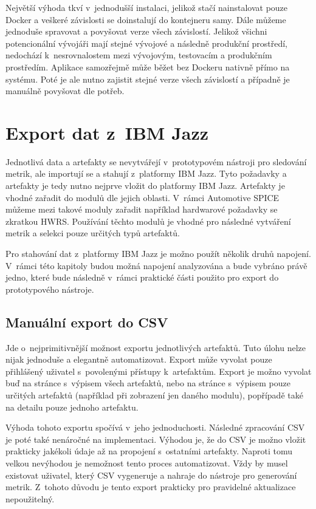 \documentclass[czech,master]{diploma}
\begin{document}
Největší výhoda tkví v~jednodušší instalaci, jelikož stačí nainstalovat pouze Docker a veškeré závislosti se doinstalují do kontejneru samy. Dále můžeme jednoduše spravovat a povyšovat verze všech závislostí. Jelikož všichni potencionální vývojáři mají stejné vývojové a následně produkční prostředí, nedochází k~nesrovnalostem mezi vývojovým, testovacím a produkčním prostředím. Aplikace samozřejmě může běžet bez Dockeru nativně přímo na systému. Poté je ale nutno zajistit stejné verze všech závislostí a případně je manuálně povyšovat dle potřeb.



\section{Export dat z~IBM Jazz}
\label{sec:ibm_export}

Jednotlivá data a artefakty se nevytvářejí v~prototypovém nástroji pro sledování metrik, ale importují se a stahují z~platformy IBM Jazz. Tyto požadavky a artefakty je tedy nutno nejprve vložit do platformy IBM Jazz. Artefakty je vhodné zařadit do modulů dle jejich oblasti. V~rámci Automotive SPICE můžeme mezi takové moduly zařadit například hardwarové požadavky se zkratkou HWRS. Používání těchto modulů je vhodné pro následné vytváření metrik a selekci pouze určitých typů artefaktů.

Pro stahování dat z~platformy IBM Jazz je možno použít několik druhů napojení. V~rámci této kapitoly budou možná napojení analyzována a bude vybráno právě jedno, které bude následně v~rámci praktické části použito pro export do prototypového nástroje.

\subsection{Manuální export do CSV}
Jde o~nejprimitivnější možnost exportu jednotlivých artefaktů. Tuto úlohu nelze nijak jednoduše a elegantně automatizovat. Export může vyvolat pouze přihlášený uživatel s~povolenými přístupy k~artefaktům. Export je možno vyvolat buď na stránce s~výpisem všech artefaktů, nebo na stránce s~výpisem pouze určitých artefaktů (například při zobrazení jen daného modulu), popřípadě také na detailu pouze jednoho artefaktu.

Výhoda tohoto exportu spočívá v~jeho jednoduchosti. Následné zpracování CSV je poté také nenáročné na implementaci. Výhodou je, že do CSV je možno vložit prakticky jakékoli údaje až na propojení s~ostatními artefakty. Naproti tomu velkou nevýhodou je nemožnost tento proces automatizovat. Vždy by musel existovat uživatel, který CSV vygeneruje a nahraje do nástroje pro generování metrik. Z~tohoto důvodu je tento export prakticky pro pravidelné aktualizace nepoužitelný.
\end{document}
